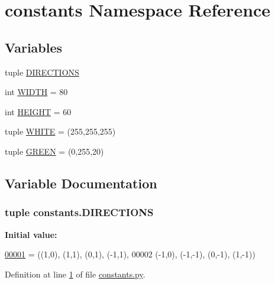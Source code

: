 \hypertarget{namespaceconstants}{\section{constants Namespace Reference}
\label{namespaceconstants}
}
\subsection*{Variables}
\begin{DoxyCompactItemize}
\item 
tuple \hyperlink{namespaceconstants_ac910045b50610ec197515a3635d8d037}{D\+I\+R\+E\+C\+T\+I\+O\+N\+S}
\item 
int \hyperlink{namespaceconstants_aa1f49ae50d4547cd3b9f4801d04f5830}{W\+I\+D\+T\+H} = 80
\item 
int \hyperlink{namespaceconstants_a581305cb095bf2d8826a12abef66a15e}{H\+E\+I\+G\+H\+T} = 60
\item 
tuple \hyperlink{namespaceconstants_ab7ba6a498f408091781f6f90a0446bcc}{W\+H\+I\+T\+E} = (255,255,255)
\item 
tuple \hyperlink{namespaceconstants_a71ba084102da630a352232ea121e0e95}{G\+R\+E\+E\+N} = (0,255,20)
\end{DoxyCompactItemize}


\subsection{Variable Documentation}
\hypertarget{namespaceconstants_ac910045b50610ec197515a3635d8d037}{
\subsubsection[{D\+I\+R\+E\+C\+T\+I\+O\+N\+S}]{\setlength{\rightskip}{0pt plus 5cm}tuple constants.\+D\+I\+R\+E\+C\+T\+I\+O\+N\+S}}\label{namespaceconstants_ac910045b50610ec197515a3635d8d037}
{\bfseries Initial value\+:}
\begin{DoxyCode}
\hypertarget{namespaceconstants_l00001}{}\hyperlink{namespaceconstants_ac910045b50610ec197515a3635d8d037}{00001} = ((1,0), (1,1), (0,1), (-1,1),
00002     (-1,0), (-1,-1), (0,-1), (1,-1))
\end{DoxyCode}


Definition at line \hyperlink{constants_8py_source_l00001}{1} of file \hyperlink{constants_8py_source}{constants.\+py}.

